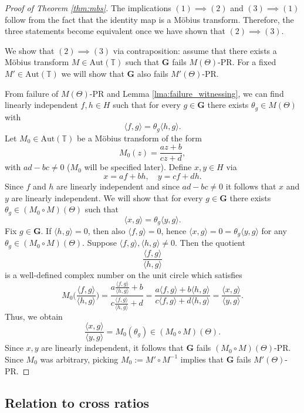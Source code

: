 \documentclass[reqno,a4paper,11pt]{amsart}
\numberwithin{equation}{section}
\def\T{{\mathbb T}}
\newcommand\1{\mathds{1}}
\begin{document}
\begin{proof}[Proof of Theorem \ref{thm:mbs}]
    The implications $(1) \implies (2)$ and $(3) \implies (1)$ follow from the fact that the identity map is a Möbius transform. Therefore, the three statements become equivalent once we have shown that $(2) \implies (3)$.
    
    We show that $(2) \implies (3)$ via contraposition: assume that there exists a Möbius transform $M\in \text{Aut}(\T)$ such that $\mathbf{G}$ fails $M(\Theta)$-PR. For a fixed $M'\in \text{Aut}(\T)$ we will show that $\mathbf{G}$ also fails $M'(\Theta)$-PR.
    
    From failure of $M(\Theta)$-PR and Lemma \ref{lma:failure_witnessing}, we can find linearly independent $f,h \in H$ such that for every $g\in \mathbf{G}$ there exists $\theta_g \in M(\Theta)$ with 
    $$
    \langle f,g\rangle = \theta_g \langle h,g\rangle.
    $$
    Let $M_0\in \text{Aut}(\T)$ be a Möbius transform of the form
    $$
    M_0(z) = \frac{az+b}{cz+d},
    $$
    with $ad-bc\neq 0$ ($M_0$ will be specified later). Define $x,y \in H$ via
    $$
    x = af+bh, \quad y = cf+dh.
    $$
    Since $f$ and $h$ are linearly independent and since $ad-bc\neq 0$ it follows that $x$ and $y$ are linearly independent. We will show that for every $g\in \mathbf{G}$ there exists $\theta_g\in (M_0 \circ M)(\Theta)$ such that 
    $$\langle x,g\rangle = \theta_g\langle y,g\rangle.$$
    Fix $g\in \mathbf{G}$. If $\langle h,g\rangle=0$, then also $\langle f,g\rangle=0$, hence $\langle x,g\rangle = 0=\theta_g\langle y,g\rangle$ for any $\theta_g \in (M_0 \circ M)(\Theta)$.
    Suppose $\langle f,g\rangle,\langle h,g\rangle\neq 0$. Then the quotient
    $$
    \frac{\langle f,g\rangle}{\langle h,g\rangle}
    $$
    is a well-defined complex number on the unit circle which satisfies 
    $$M_0\Big(\frac{\langle f,g\rangle}{\langle h,g\rangle}\Big) = \frac{a\frac{\langle f,g\rangle}{\langle h,g\rangle}+b}{c\frac{\langle f,g\rangle}{\langle h,g\rangle}+d}=\frac{a\langle f,g\rangle + b\langle h,g\rangle}{c\langle f,g\rangle + d\langle h,g\rangle} = \frac{\langle x,g\rangle}{\langle y,g\rangle}.$$
    Thus, we obtain
    $$\frac{\langle x,g\rangle}{\langle y,g\rangle} = M_0(\theta_g) \in (M_0 \circ M)(\Theta).$$ 
    Since $x,y$ are linearly independent, it follows that $\mathbf{G}$ fails $(M_0 \circ M)(\Theta)$-PR. Since $M_0$ was arbitrary, picking $M_0:=M'\circ M^{-1}$ implies that $\mathbf{G}$ fails $M'(\Theta)$-PR.
\end{proof}

\subsection{Relation to cross ratios}
\end{document}
